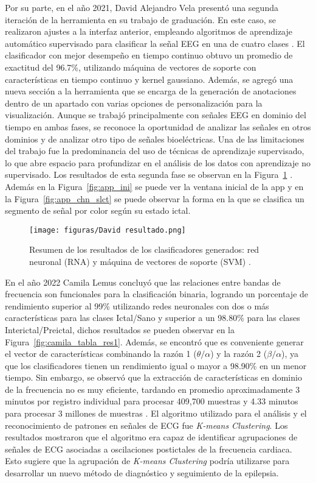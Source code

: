 Por su parte, en el año 2021, David Alejandro Vela presentó una segunda iteración de la herramienta en su trabajo de graduación. En este caso, se realizaron ajustes a la interfaz anterior, empleando algoritmos de aprendizaje automático supervisado para clasificar la señal EEG en una de cuatro clases \cite{david_2022}. El clasificador con mejor desempeño en tiempo continuo obtuvo un promedio de exactitud del 96.7\%, utilizando máquina de vectores de soporte con características en tiempo continuo y \gls{kernel} gaussiano. Además, se agregó una nueva sección a la herramienta que se encarga de la generación de anotaciones dentro de un apartado con varias opciones de personalización para la visualización. Aunque se trabajó principalmente con señales EEG en dominio del tiempo en ambas fases, se reconoce la oportunidad de analizar las señales en otros dominios y de analizar otro tipo de señales bioeléctricas. Una de las limitaciones del trabajo fue la predominancia del uso de técnicas de aprendizaje supervisado, lo que abre espacio para profundizar en el análisis de los datos con aprendizaje no supervisado. Los resultados de esta segunda fase se observan en la Figura~\ref{fig:mesh1} \cite{david_2022}. Además en la Figura~\ref{fig:app_ini} se puede ver la ventana inicial de la app y en la Figura~\ref{fig:app_chn_slct} se puede observar la forma en la que se clasifica un segmento de señal por color según su estado ictal.

\begin{figure}[t]
    \centering
    \texttt{[image: figuras/David resultado.png]}
    \caption{Resumen de los resultados de los clasificadores generados: red neuronal (RNA) y máquina de vectores de soporte (SVM) \cite{david_2022}.}
    \label{fig:mesh1}
\end{figure}

En el año 2022 Camila Lemus \cite{camila_2022} concluyó que las relaciones entre bandas de frecuencia son funcionales para la clasificación binaria, logrando un porcentaje de rendimiento superior al 99\% utilizando redes neuronales con dos o más características para las clases Ictal/Sano y superior a un 98.80\% para las clases Interictal/Preictal, dichos resultados se pueden observar en la Figura~\ref{fig:camila_tabla_res1}. Además, se encontró que es conveniente generar el vector de características combinando la razón 1 ($\theta/\alpha$) y la razón 2 ($\beta/\alpha$), ya que los clasificadores tienen un rendimiento igual o mayor a 98.90\% en un menor tiempo. Sin embargo, se observó que la extracción de características en dominio de la frecuencia no es muy eficiente, tardando en promedio aproximadamente 3 minutos por registro individual para procesar 409,700 muestras y 4.33 minutos para procesar 3 millones de muestras \cite{camila_2022}. El \gls{algoritmo} utilizado para el análisis y el reconocimiento de patrones en señales de ECG fue \textit{K-means Clustering}. Los resultados mostraron que el algoritmo era capaz de identificar agrupaciones de señales de ECG asociadas a oscilaciones postictales de la frecuencia cardiaca. Esto sugiere que la agrupación de \textit{K-means Clustering} podría utilizarse para desarrollar un nuevo método de diagnóstico y seguimiento de la epilepsia.

